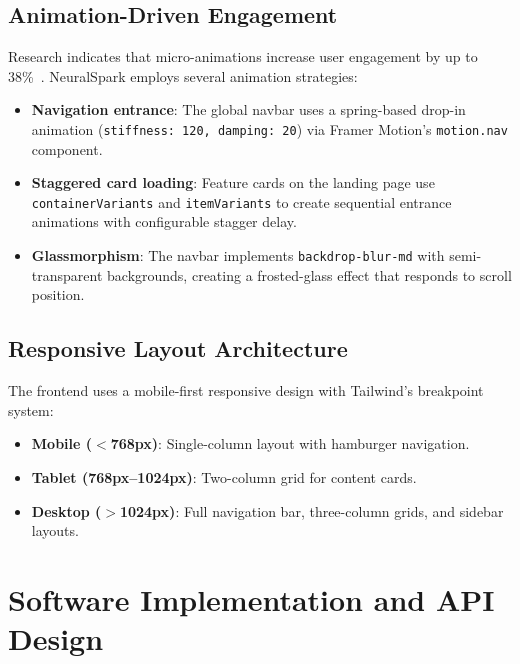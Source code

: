 \documentclass[conference]{IEEEtran}
\begin{document}
\subsection{Animation-Driven Engagement}
Research indicates that micro-animations increase user engagement by up to 38\%~\cite{ux_engagement}. NeuralSpark employs several animation strategies:
\begin{itemize}[leftmargin=*]
    \item \textbf{Navigation entrance}: The global navbar uses a spring-based drop-in animation (\texttt{stiffness: 120, damping: 20}) via Framer Motion's \texttt{motion.nav} component.
    \item \textbf{Staggered card loading}: Feature cards on the landing page use \texttt{containerVariants} and \texttt{itemVariants} to create sequential entrance animations with configurable stagger delay.
    \item \textbf{Glassmorphism}: The navbar implements \texttt{backdrop-blur-md} with semi-transparent backgrounds, creating a frosted-glass effect that responds to scroll position.
\end{itemize}

\subsection{Responsive Layout Architecture}
The frontend uses a mobile-first responsive design with Tailwind's breakpoint system:
\begin{itemize}[leftmargin=*]
    \item \textbf{Mobile ($<$768px)}: Single-column layout with hamburger navigation.
    \item \textbf{Tablet (768px--1024px)}: Two-column grid for content cards.
    \item \textbf{Desktop ($>$1024px)}: Full navigation bar, three-column grids, and sidebar layouts.
\end{itemize}

\section{Software Implementation and API Design}
\end{document}

